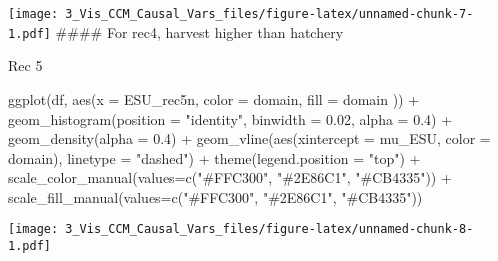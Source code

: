 \documentclass[
]{article}
\newenvironment{Shaded}{\begin{snugshade}}{\end{snugshade}}
\newcommand{\AttributeTok}[1]{\textcolor[rgb]{0.77,0.63,0.00}{#1}}
\newcommand{\FloatTok}[1]{\textcolor[rgb]{0.00,0.00,0.81}{#1}}
\newcommand{\FunctionTok}[1]{\textcolor[rgb]{0.00,0.00,0.00}{#1}}
\newcommand{\NormalTok}[1]{#1}
\newcommand{\SpecialCharTok}[1]{\textcolor[rgb]{0.00,0.00,0.00}{#1}}
\newcommand{\StringTok}[1]{\textcolor[rgb]{0.31,0.60,0.02}{#1}}
\begin{document}
\texttt{[image: 3\_Vis\_CCM\_Causal\_Vars\_files/figure-latex/unnamed-chunk-7-1.pdf]}
\#\#\#\# For rec4, harvest higher than hatchery

Rec 5

\begin{Shaded}
\begin{Highlighting}[]
\FunctionTok{ggplot}\NormalTok{(df, }\FunctionTok{aes}\NormalTok{(}\AttributeTok{x =}\NormalTok{ ESU\_rec5n, }\AttributeTok{color =}\NormalTok{ domain, }\AttributeTok{fill =}\NormalTok{ domain )) }\SpecialCharTok{+}
  \FunctionTok{geom\_histogram}\NormalTok{(}\AttributeTok{position =} \StringTok{"identity"}\NormalTok{, }\AttributeTok{binwidth =} \FloatTok{0.02}\NormalTok{, }\AttributeTok{alpha =} \FloatTok{0.4}\NormalTok{) }\SpecialCharTok{+}
  \FunctionTok{geom\_density}\NormalTok{(}\AttributeTok{alpha =} \FloatTok{0.4}\NormalTok{) }\SpecialCharTok{+}
  \FunctionTok{geom\_vline}\NormalTok{(}\FunctionTok{aes}\NormalTok{(}\AttributeTok{xintercept =}\NormalTok{ mu\_ESU, }\AttributeTok{color =}\NormalTok{ domain),}
             \AttributeTok{linetype =} \StringTok{"dashed"}\NormalTok{) }\SpecialCharTok{+}
  \FunctionTok{theme}\NormalTok{(}\AttributeTok{legend.position =} \StringTok{"top"}\NormalTok{) }\SpecialCharTok{+}
  \FunctionTok{scale\_color\_manual}\NormalTok{(}\AttributeTok{values=}\FunctionTok{c}\NormalTok{(}\StringTok{"\#FFC300"}\NormalTok{, }\StringTok{"\#2E86C1"}\NormalTok{, }\StringTok{"\#CB4335"}\NormalTok{)) }\SpecialCharTok{+}
  \FunctionTok{scale\_fill\_manual}\NormalTok{(}\AttributeTok{values=}\FunctionTok{c}\NormalTok{(}\StringTok{"\#FFC300"}\NormalTok{, }\StringTok{"\#2E86C1"}\NormalTok{, }\StringTok{"\#CB4335"}\NormalTok{))}
\end{Highlighting}
\end{Shaded}

\texttt{[image: 3\_Vis\_CCM\_Causal\_Vars\_files/figure-latex/unnamed-chunk-8-1.pdf]}
\end{document}
